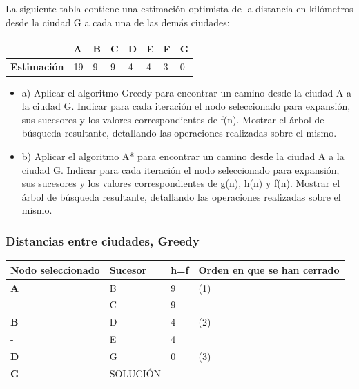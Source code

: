 \documentclass[xcolor=table]{beamer}
\begin{document}
\begin{frame}
La siguiente tabla contiene una estimación optimista de la distancia en kilómetros desde la ciudad G a cada una de las demás ciudades:

\begin{table}[]
\begin{tabular}{|l|l|l|l|l|l|l|l|}
\hline
                    & A  & B & C & D & E & F & G \\ \hline
\textbf{Estimación} & 19 & 9 & 9 & 4 & 4 & 3 & 0 \\ \hline
\end{tabular}
\end{table}

\begin{itemize}
    \item a) Aplicar el algoritmo Greedy para encontrar un camino desde la ciudad A a la ciudad G. Indicar para cada iteración el nodo seleccionado para expansión, sus sucesores y los valores correspondientes de f(n). Mostrar el árbol de búsqueda resultante, detallando las operaciones realizadas sobre el mismo.
    \item b) Aplicar el algoritmo A* para encontrar un camino desde la ciudad A a la ciudad G. Indicar para cada iteración el nodo seleccionado para expansión, sus sucesores y los valores correspondientes de g(n), h(n) y f(n). Mostrar el árbol de búsqueda resultante, detallando las operaciones realizadas sobre el mismo.
\end{itemize}

\end{frame} 


\begin{frame} \frametitle{Distancias entre ciudades, Greedy} \footnotesize

\begin{table}[]
\begin{tabular}{|l|l|l|l|}
\hline
\rowcolor[HTML]{C0C0C0} 
\textbf{Nodo seleccionado}  & \textbf{Sucesor}           & \textbf{h=f}               & \textbf{Orden en que se han cerrado} \\ \hline
\textbf{A}         & B            & 9         &    (1)         \\ \hline
-                  & C            & 9        &          \\ \hline\hline

\textbf{B}     & D           & 4   & (2)          \\ \hline
-                  & E            & 4  &                \\ \hline\hline

\textbf{D}   & G             & 0                  & (3)     \\ \hline\hline

\textbf{G}   & SOLUCIÓN             & -             & -    \\ \hline

\end{tabular}
\end{table}

\end{frame} 
\end{document}

